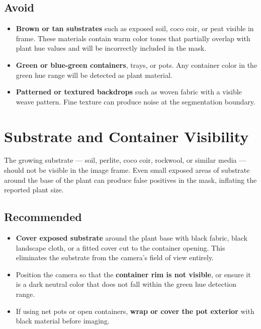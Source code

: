 \documentclass[12pt,a4paper,oneside]{report}
\begin{document}
\subsection*{Avoid}

\begin{itemize}
    \item \textbf{Brown or tan substrates} such as exposed soil, coco coir, or peat visible in frame. These materials contain warm color tones that partially overlap with plant hue values and will be incorrectly included in the mask.
    \item \textbf{Green or blue-green containers}, trays, or pots. Any container color in the green hue range will be detected as plant material.
    \item \textbf{Patterned or textured backdrops} such as woven fabric with a visible weave pattern. Fine texture can produce noise at the segmentation boundary.
\end{itemize}

\section{Substrate and Container Visibility}

The growing substrate — soil, perlite, coco coir, rockwool, or similar media — should not be visible in the image frame. Even small exposed areas of substrate around the base of the plant can produce false positives in the mask, inflating the reported plant size.

\subsection*{Recommended}

\begin{itemize}
    \item \textbf{Cover exposed substrate} around the plant base with black fabric, black landscape cloth, or a fitted cover cut to the container opening. This eliminates the substrate from the camera's field of view entirely.
    \item Position the camera so that the \textbf{container rim is not visible}, or ensure it is a dark neutral color that does not fall within the green hue detection range.
    \item If using net pots or open containers, \textbf{wrap or cover the pot exterior} with black material before imaging.
\end{itemize}
\end{document}
